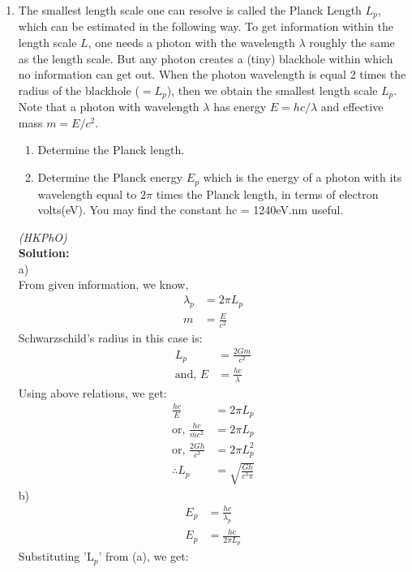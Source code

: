 \begin{enumerate}
\item The smallest length scale one can resolve is called the Planck Length $L_p$, which can be estimated in the following way. To get information within the length scale $L$, one needs a photon with the wavelength $\lambda$ roughly the same as the length scale. But any photon creates a (tiny) blackhole within which no information can get out. When the photon wavelength is equal 2 times the radius of the blackhole ($=L_p$), then we obtain the smallest length scale $L_p$. Note that a photon with wavelength $\lambda$ has energy $E = hc/\lambda$ and effective mass $m = E/c^2$. 
\begin{enumerate}
    \item Determine the Planck length.
    \item Determine the Planck energy $E_p$ which is the energy of a photon with its wavelength equal to $2\pi$ times the Planck length, in terms of electron volts(eV). You may find the constant hc = 1240eV.nm useful. 
\end{enumerate}
\hfill \textsl{(HKPhO)}\\
\textbf{Solution:}\\
a) \\
From given information, we know, \\
\begin{align}
    \lambda_p &= 2\pi L_p \\
    m &= \frac{E}{c^2}
\end{align}
Schwarzschild's radius in this case is: 
\begin{align}
    L_p  &= \frac{2Gm}{c^2}\\
    \text{and, }E &= \frac{hc}{\lambda}
\end{align}
Using above relations, we get: \\
\begin{align*}
    \frac{hc}{E}  &=  2\pi L_p \\
    \text{or, }\frac{hc}{mc^2}   &=   2\pi L_p\\
    \text{or, }\frac{2Gh}{c^3}  &=  2\pi L^2_p\\
    \therefore L_p &= \sqrt{\frac{Gh}{c^3\pi}}
\end{align*}
b) \\
\begin{align*}
    E_p &= \frac{hc}{\lambda_p}\\
    E_p &= \frac{hc}{2\pi L_p}
\end{align*}
Substituting 'L$_p$' from (a), we get:
\begin{align*}

\end{align*}
\end{enumerate}

